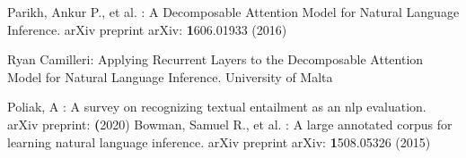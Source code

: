 \documentclass[runningheads]{llncs}
\begin{document}
%
%



%
%
%
% 
% 
%

\begin{thebibliography}{8}
Parikh, Ankur P., et al. : A Decomposable Attention Model for Natural Language Inference.  arXiv preprint arXiv: \textbf1606.01933  (2016)

Ryan Camilleri: Applying Recurrent Layers to the Decomposable Attention Model for Natural Language Inference. University of Malta

Poliak, A : A survey on recognizing textual entailment as an nlp evaluation. arXiv preprint: \textbf  (2020)
Bowman, Samuel R., et al. : A large annotated corpus for learning natural language inference.  arXiv preprint arXiv: \textbf1508.05326  (2015)


\end{thebibliography}
\end{document}
